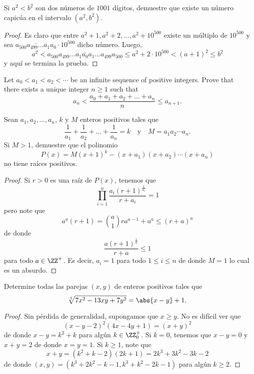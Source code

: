 \begin{probEG}
	Si $a^2<b^2$ son dos números de $1001$ dígitos, demuestre que existe un número capicúa en el intervalo $(a^2,b^2)$.
\end{probEG}

\begin{proof}
	Es claro que entre $a^2+1,a^2+2,\dots,a^2+10^{500}$ existe un múltiplo de $10^{500}$ y sea $\overline{a_{500}a_{499}\dots a_1a_0}\cdot 10^{500}$ dicho número. Luego,
	\[a^2<\overline{a_{500}a_{499}\dots a_1a_0a_1\dots a_{499}a_{500}}\le a^2+2\cdot 10^{500}<(a+1)^2\le b^2\]
	y aquí se termina la prueba.
\end{proof}

\begin{probEG}[IMO 2014/1]
	Let $a_0<a_1<a_2<\cdots$ be an infinite sequence of positive integers. Prove that there exists a unique integer $n\ge 1$ such that
	\[a_n<\frac{a_0+a_1+a_2+\dots+a_n}{n}\le a_{n+1}.\]
\end{probEG}

\begin{probEG}
	Sean $a_1,a_2,\dots,a_n$, $k$ y $M$ enteros positivos tales que
	\[\frac{1}{a_1}+\frac{1}{a_2}+\dots+\frac{1}{a_n}=k\quad\text{y}\quad M=a_1a_2\cdots a_n.\]
	Si $M>1$, demuestre que el polinomio
	\[P(x)=M(x+1)^k-(x+a_1)(x+a_2)\cdots(x+a_n)\]
	no tiene raíces positivos.
\end{probEG}

\begin{proof}
	Si $r>0$ es una raíz de $P(x)$, tenemos que
	\[\prod_{i=1}^n\frac{a_i(r+1)^\frac{1}{a_i}}{r+a_i}=1\]
	pero note que
	\[a^a(r+1)=\binom{a}{1}ra^{a-1}+a^a\le(r+a)^a\]
	de donde
	\[\frac{a(r+1)^\frac{1}{a}}{r+a}\le 1\]
	para todo $a\in\ZZ^+$. Es decir, $a_i=1$ para todo $1\le i\le n$ de donde $M=1$ lo cual es un absurdo.
\end{proof}

\begin{probEG}
	Determine todas las parejas $(x,y)$ de enteros positivos tales que
	\[\sqrt[3]{7x^2-13xy+7y^2}=\abs{x-y}+1.\]
\end{probEG}

\begin{proof}
	Sin pérdida de generalidad, supongamos que $x\ge y$. No es difícil ver que
	\[(x-y-2)^2(4x-4y+1)=(x+y)^2\]
	de donde $x-y=k^2+k$ para algún $k\in\ZZ^+_0$. Si $k=0$, tenemos que $x-y=0$ y $x+y=2$ de donde $x=y=1$. Si $k\ge 1$, note que
	\[x+y=(k^2+k-2)(2k+1)=2k^3+3k^2-3k-2\]
	de donde $(x,y)=(k^3+2k^2-k-1,k^3+k^2-2k-1)$ para algún $k\ge 2$.
\end{proof}

